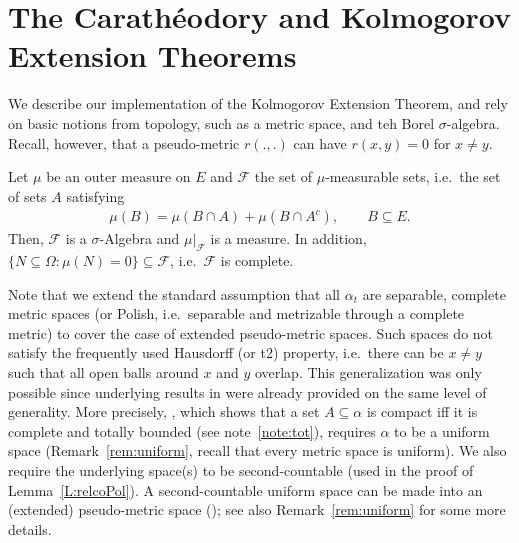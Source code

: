 \documentclass[lean]{AFM}
\begin{document}
\section{The Carathéodory and Kolmogorov Extension Theorems}
\label{S:extension}
We describe our implementation of the Kolmogorov Extension Theorem, and rely on basic notions from topology, such as a metric space, and teh Borel $\sigma$-algebra. Recall, however, that a pseudo-metric $r(.,.)$ can have $r(x,y) = 0$ for $x\neq y$.


\begin{theorem}\label{T:cara} Let $\mu$ be an outer measure on
  $E$ and $\mathcal F$ the set of $\mu$-measurable sets,
  i.e.\ the set of sets $A$ satisfying
  \begin{align*}
    \mu(B) = \mu(B\cap A) + \mu(B\cap A^c), \qquad B \subseteq E.
  \end{align*}
  Then, $\mathcal F$ is a $\sigma$-Algebra and $\mu|_{\mathcal F}$ is
  a measure. In addition, $\{N\subseteq \Omega:
  \mu(N)=0\}\subseteq \mathcal F$, i.e.\ $\mathcal F$ is complete.
\end{theorem}

Note that we extend the standard assumption that all $\alpha_t$ are
separable, complete metric spaces (or Polish, i.e.\ separable and
metrizable through a complete metric) to cover the case of extended
pseudo-metric spaces. Such spaces do not satisfy the frequently used
Hausdorff (or t2) property, i.e.\ there can be $x\neq y$ such that all
open balls around $x$ and $y$ overlap.  This generalization was only
possible since underlying results in  were already
provided on the same level of generality.  More precisely,
, which shows that a
set $A \subseteq \alpha$ is compact iff it is complete and totally
bounded (see note~\ref{note:tot}), requires $\alpha$ to be a uniform
space (Remark~\ref{rem:uniform}, recall that every metric space is
uniform).  We also require the underlying space(s) to be
second-countable (used in the proof of Lemma~\ref{L:relcoPol}).  A
second-countable uniform space can be made into an (extended)
pseudo-metric space ();
see also Remark~\ref{rem:uniform} for some more details.
\end{document}
